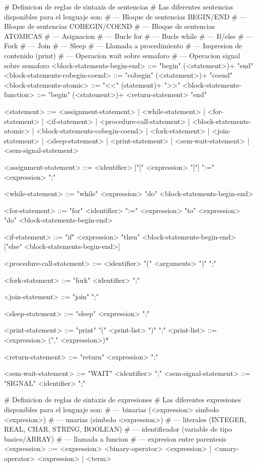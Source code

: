 \begin{BNFCode}
# Definicion de reglas de sintaxis de sentencias
# Las diferentes sentencias disponibles para el lenguaje son:
#   --- Bloque de sentencias BEGIN/END
#   --- Bloque de sentencias COBEGIN/COEND
#   --- Bloque de sentencias ATOMICAS
#   --- Asignacion
#   --- Bucle for
#   --- Bucle while
#   --- If/else
#   --- Fork
#   --- Join
#   --- Sleep
#   --- Llamada a procedimiento
#   --- Impresion de contenido (print)
#   --- Operacion wait sobre semaforo
#   --- Operacion signal sobre semaforo
<block-statements-begin-end> ::= "begin" (<statement>)+ "end"
<block-statements-cobegin-coend> ::= "cobegin" 
    (<statement>)+ "coend"
<block-statements-atomic> ::= "<<" (statement)+ ">>"
<block-statements-function> ::= "begin" (<statement>)+ 
    <return-statement> "end"
	
<statement> ::= <assignment-statement>
    | <while-statement>
    | <for-statement>
    | <if-statement>
    | <procedure-call-statement>
    | <block-statements-atomic>
    | <block-statements-cobegin-coend>
    | <fork-statement>
    | <join-statement>
    | <sleep-statement>
    | <print-statement>
    | <sem-wait-statement>
    | <sem-signal-statement>
	
<assignment-statement> ::= <identifier> ["[" <expression> "]"] 
    ":=" <expression> ";"
    
<while-statement> ::= "while" <expression> "do" 
    <block-statements-begin-end>
    
<for-statement> ::= "for" <identifier> ":=" <expression> "to" 
    <expression> "do" <block-statements-begin-end>
    
<if-statement> ::= "if" <expression> "then" 
    <block-statements-begin-end> 
    ["else" <block-statements-begin-end>]
    
<procedure-call-statement> ::= <identifier> "(" <arguments> ")" ";"

<fork-statement> ::= "fork" <identifier> ";"

<join-statement> ::= "join" ";"

<sleep-statement> ::= "sleep" <expression> ";"

<print-statement> ::= "print" "(" <print-list> ")" ";"
<print-list> ::= <expression> ("," <expression>)*

<return-statement> ::= "return" <expression> ";"

<sem-wait-statement> ::= "WAIT" <identifier> ";"
<sem-signal-statement> ::= "SIGNAL" <identifier> ";"

# Definicion de reglas de sintaxis de expresiones
# Las diferentes expresiones disponibles para el lenguaje son:
#   --- binarias (<expression> simbolo <expresion>)
#   --- unarias  (simbolo <expression>)
#   --- literales (INTEGER, REAL, CHAR, STRING, BOOLEAN)
#   --- identificador (variable de tipo basico/ARRAY)
#   --- llamada a funcion
#   --- expresion entre parentesis
<expression> ::= <expression> <binary-operator> <expression>
	| <unary-operator> <expression>
	| <term>


\end{BNFCode}

